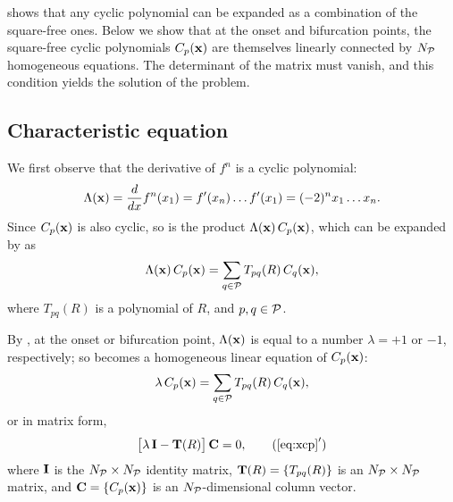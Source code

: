 \documentclass[twocolumn]{revtex4-1}
\begin{document}
  shows that any cyclic polynomial can be expanded
  as a combination of the square-free ones.
Below we show that at the onset and bifurcation points,
  the square-free cyclic polynomials $C_p(\mathbf{x})$ are themselves
  linearly connected by $N_\mathcal P$ homogeneous equations.
The determinant of the matrix must vanish,
  and this condition yields the solution of the problem.


\subsection{\label{sec:algo}Characteristic equation}


We first observe that the derivative of $f^n$
is a cyclic polynomial:
%
%
\begin{equation}
  \Lambda(\mathbf{x})
   = \frac{d}{dx}f^{n}(x_1)
   = f'(x_n) \dots f'(x_1)
   = (-2)^n x_1 \dots x_n.
\label{eq:logder}
\end{equation}
%
%
Since $C_p(\mathbf{x})$ is also cyclic,
  so is the product $\Lambda(\mathbf{x}) \, C_p(\mathbf{x})$,
  which can be expanded by  as
\begin{equation}
  \Lambda(\mathbf{x}) \, C_p(\mathbf{x}) = \sum_{q \in \mathcal P} T_{pq}(R) \, C_q(\mathbf{x}),
\label{eq:xcp0}
\end{equation}
where $T_{pq}(R)$ is a polynomial of $R$,
and $p, q \in \mathcal P$.



By , at the onset or bifurcation point,
  $\Lambda(\mathbf{x})$ is equal to a number
  $\lambda = +1$ or $-1$, respectively;
  so 
  becomes a homogeneous linear equation of
  $C_p(\mathbf{x})$:
\begin{equation}
  \lambda \, C_p(\mathbf{x}) = \sum_{q \in \mathcal P} T_{pq}(R) \, C_q(\mathbf{x}),
\label{eq:xcp}
\end{equation}
%
%
or in matrix form,
\begin{equation}
  \big[ \lambda \, \vct I - \vct T(R) \big] \, \vct C = 0,
\tag{$\ref{eq:xcp}'$}
\end{equation}
%
%
where
$\mathbf{I}$ is the $N_\mathcal P \times N_\mathcal P$ identity matrix,
$\mathbf{T}(R) = \{T_{pq}(R)\}$ is an $N_\mathcal P \times N_\mathcal P$ matrix,
and
$\mathbf{C} = \{C_p(\mathbf{x})\}$ is an $N_\mathcal P$-dimensional column vector.
\end{document}
